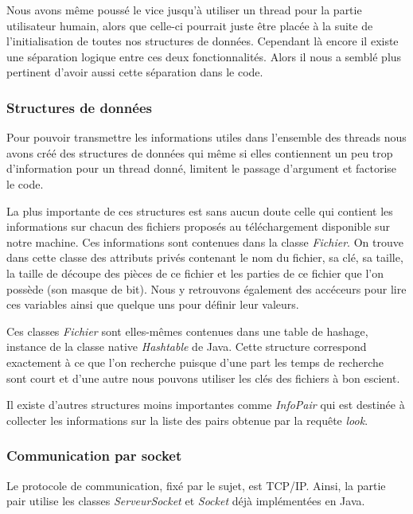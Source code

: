 Nous avons même poussé le vice jusqu'à utiliser un thread pour la
partie utilisateur humain, alors que celle-ci pourrait juste être placée
à la suite de l'initialisation de toutes nos structures de
données. Cependant là encore il existe une séparation logique entre
ces deux fonctionnalités. Alors il nous a semblé plus pertinent
d'avoir aussi cette séparation dans le code.

\subsubsection{Structures de données}
Pour pouvoir transmettre les informations utiles dans l'ensemble des
threads nous avons créé des structures de données qui même si elles
contiennent un peu trop d'information pour un thread donné, limitent le
passage d'argument et factorise le code.

La plus importante de ces structures est sans aucun doute celle qui
contient les informations sur chacun des fichiers proposés au
téléchargement disponible sur notre machine. Ces informations sont
contenues dans la classe \textit{Fichier}. On trouve dans cette classe
des attributs privés contenant le nom du fichier, sa clé, sa taille,
la taille de découpe des pièces de ce fichier et les parties de ce
fichier que l'on possède (son masque de bit). Nous y retrouvons
également des accéceurs pour lire ces variables ainsi que quelque uns
pour définir leur valeurs. 

Ces classes \textit{Fichier} sont elles-mêmes contenues dans une table
de hashage, instance de la classe native \textit{Hashtable} de Java.
Cette structure correspond exactement à ce que l'on recherche puisque
d'une part les temps de recherche sont court et d'une autre nous
pouvons utiliser les clés des fichiers à bon escient.

Il existe d'autres structures moins importantes comme
\textit{InfoPair} qui est destinée à collecter les informations sur la
liste des pairs obtenue par la requête \textit{look}.

%
%


\subsubsection{Communication par socket}
Le protocole de communication, fixé par le sujet, est TCP/IP. Ainsi, 
la partie pair utilise les classes \textit{ServeurSocket}
et \textit{Socket} déjà implémentées en Java.

